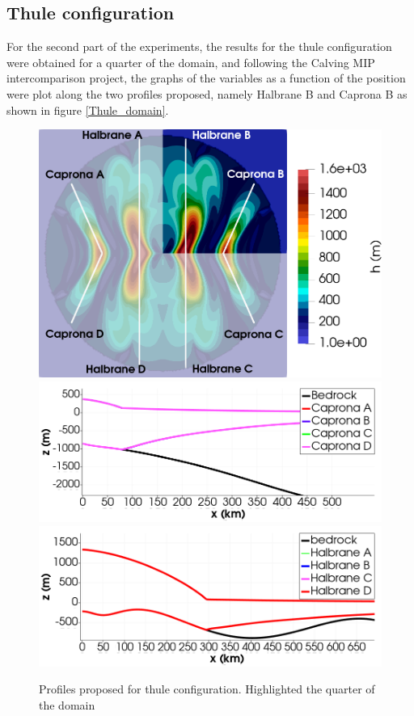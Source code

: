 \documentclass{article}
\begin{document}
\subsection{Thule configuration}
For the second part of the experiments, the results for the thule configuration were obtained for a quarter of the domain, and following the Calving MIP intercomparison project, the graphs of the variables as a function of the position were plot along the two profiles proposed, namely Halbrane B and Caprona B as shown in figure \ref{Thule_domain}.

	\begin{figure}[!h]
		\centering
		\includegraphics[width=0.4\linewidth]{../fig/Profiles_Thule_combined_domains_2_con_fondo.png}
        \includegraphics[width=0.4\linewidth]{../fig/Capronas_Thule_Domain_con_fondo.png}
        \includegraphics[width=0.4\linewidth]{../fig/Halbranes_thule_domain_con_fondo.png}
		\caption{Profiles proposed for thule configuration. Highlighted the quarter of the domain}
		\label{Thule_profiles_domain_combined}
	\end{figure}
\end{document}

